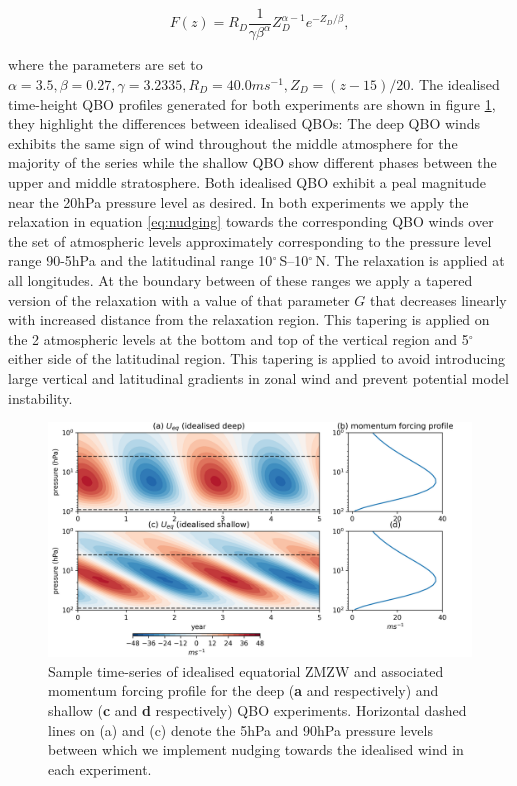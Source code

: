 \begin{equation} \label{eq:vertical_profile}
F(z) = R_D \frac{1}{\gamma \beta^\alpha}  Z_D^{\alpha-1}  e^{-Z_D/\beta},
\end{equation}

where the parameters are set to $\alpha = 3.5, \beta = 0.27, \gamma = 3.2335, R_D = 40.0 ms^{-1}, Z_{D} = (z - 15)/20$. The idealised time-height QBO profiles generated for both experiments are shown in figure \ref{fig:Idealised_QBO_samples}, they highlight the differences between idealised QBOs: The deep QBO winds exhibits the same sign of wind throughout the middle atmosphere for the majority of the series while the shallow QBO show different phases between the upper and middle stratosphere. Both idealised QBO exhibit a peal magnitude near the 20hPa pressure level as desired. In both experiments we apply the relaxation in equation \ref{eq:nudging} towards the corresponding QBO winds over the set of atmospheric levels approximately corresponding to the pressure level range 90-5hPa and the latitudinal range 10$^{\circ}$\,S--10$^{\circ}$\,N. The relaxation is applied at all longitudes. At the boundary between of these ranges we apply a tapered version of the relaxation with a value of that parameter $G$ that decreases linearly with increased distance from the relaxation region. This tapering is applied on the 2 atmospheric levels at the bottom and top of the vertical region and 5$^\circ$ either side of the latitudinal region. This tapering is applied to avoid introducing large vertical and latitudinal gradients in zonal wind and prevent potential model instability. 

\begin{figure}[h!]
\begin{center}
\noindent\includegraphics[width = \linewidth]{Figures/Figures-deepQBO/Idealised_QBO_features.png}
\caption[Idealised QBO winds used for nudging experiments]{Sample time-series of idealised equatorial ZMZW and associated momentum forcing profile for the deep (\textbf{a} and  respectively) and shallow (\textbf{c} and \textbf{d} respectively) QBO experiments. Horizontal dashed lines on (a) and (c) denote the 5hPa and 90hPa pressure levels between which we implement nudging towards the idealised wind in each experiment.}
\label{fig:Idealised_QBO_samples}
\end{center}
\end{figure}

